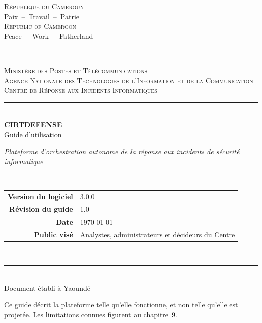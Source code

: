 \thispagestyle{empty}
\begin{center}

{\large\scshape République du Cameroun}\\[2pt]
{\small Paix~--~Travail~--~Patrie}\\[10pt]
{\large\scshape Republic of Cameroon}\\[2pt]
{\small Peace~--~Work~--~Fatherland}\\[16pt]

\rule{\textwidth}{1.2pt}\\[4pt]
{\small\scshape Minist\`ere des Postes et T\'el\'ecommunications}\\[3pt]
{\small\scshape Agence Nationale des Technologies de l'Information
et de la Communication}\\[3pt]
{\small\scshape Centre de R\'eponse aux Incidents Informatiques}\\[4pt]
\rule{\textwidth}{1.2pt}\\[38pt]

{\Huge\bfseries CIRTDEFENSE}\\[10pt]
{\LARGE Guide d'utilisation}\\[26pt]

\begin{minipage}{0.82\textwidth}
\centering\itshape\large
Plateforme d'orchestration autonome de la r\'eponse aux incidents
de s\'ecurit\'e informatique
\end{minipage}\\[42pt]

\begin{tabular}{rl}
  \textbf{Version du logiciel} & 3.0.0 \\[4pt]
  \textbf{R\'evision du guide} & 1.0 \\[4pt]
  \textbf{Date} & \today \\[4pt]
  \textbf{Public vis\'e} & Analystes, administrateurs et d\'ecideurs du Centre \\
\end{tabular}\\[46pt]

\rule{0.6\textwidth}{0.5pt}\\[10pt]
{\small Document \'etabli \`a Yaound\'e}

\vfill
{\footnotesize
Ce guide d\'ecrit la plateforme telle qu'elle fonctionne, et non telle
qu'elle est projet\'ee. Les limitations connues figurent au chapitre~9.}

\end{center}

